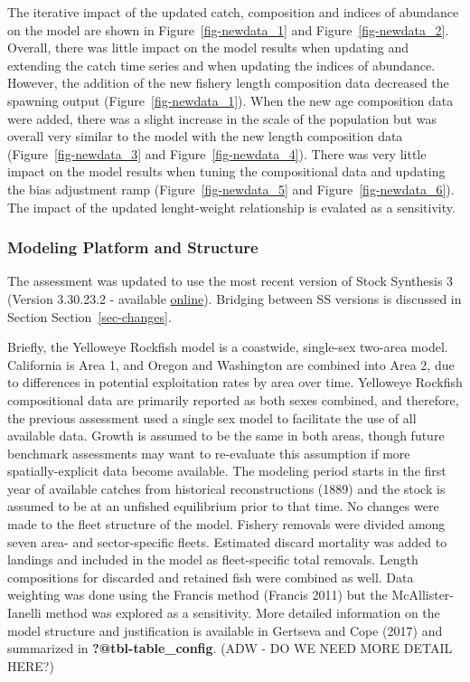 \documentclass[
]{scrartcl}
\begin{document}
The iterative impact of the updated catch, composition and indices of
abundance on the model are shown in Figure~\ref{fig-newdata_1} and
Figure~\ref{fig-newdata_2}. Overall, there was little impact on the
model results when updating and extending the catch time series and when
updating the indices of abundance. However, the addition of the new
fishery length composition data decreased the spawning output
(Figure~\ref{fig-newdata_1}). When the new age composition data were
added, there was a slight increase in the scale of the population but
was overall very similar to the model with the new length composition
data (Figure~\ref{fig-newdata_3} and Figure~\ref{fig-newdata_4}). There
was very little impact on the model results when tuning the
compositional data and updating the bias adjustment ramp
(Figure~\ref{fig-newdata_5} and Figure~\ref{fig-newdata_6}). The impact
of the updated lenght-weight relationship is evalated as a sensitivity.

\subsubsection{Modeling Platform and
Structure}\label{modeling-platform-and-structure}

The assessment was updated to use the most recent version of Stock
Synthesis 3 (Version 3.30.23.2 - available
\href{https://github.com/nmfs-ost/ss3-source-code/releases/tag/v3.30.23.2}{online}).
Bridging between SS versions is discussed in Section
Section~\ref{sec-changes}.

Briefly, the Yelloweye Rockfish model is a coastwide, single-sex
two-area model. California is Area 1, and Oregon and Washington are
combined into Area 2, due to differences in potential exploitation rates
by area over time. Yelloweye Rockfish compositional data are primarily
reported as both sexes combined, and therefore, the previous assessment
used a single sex model to facilitate the use of all available data.
Growth is assumed to be the same in both areas, though future benchmark
assessments may want to re-evaluate this assumption if more
spatially-explicit data become available. The modeling period starts in
the first year of available catches from historical reconstructions
(1889) and the stock is assumed to be at an unfished equilibrium prior
to that time. No changes were made to the fleet structure of the model.
Fishery removals were divided among seven area- and sector-specific
fleets. Estimated discard mortality was added to landings and included
in the model as fleet-specific total removals. Length compositions for
discarded and retained fish were combined as well. Data weighting was
done using the Francis method (Francis 2011) but the McAllister-Ianelli
method was explored as a sensitivity. More detailed information on the
model structure and justification is available in Gertseva and Cope
(2017) and summarized in \textbf{?@tbl-table\_config}. (ADW - DO WE NEED
MORE DETAIL HERE?)
\end{document}
